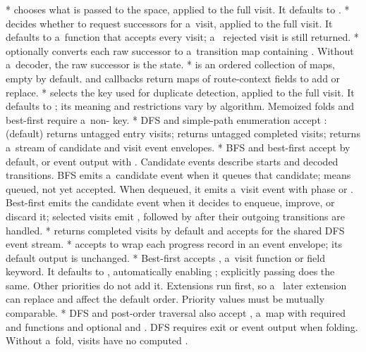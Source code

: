 {\begitems
*  chooses what is passed to the space, applied to the full
  visit. It defaults to .
*  decides whether to request successors for a~visit, applied
  to the full visit. It defaults to a~function that accepts every visit; a~
  rejected visit is still returned.
*  optionally converts each raw successor to a~transition
  map containing . Without a~decoder, the raw successor is the
  state.
*  is an ordered collection of maps, empty by default.
   and  callbacks return maps of route-context fields
  to add or replace.
*  selects the key used for duplicate detection, applied to
  the full visit. It defaults to ; its meaning and restrictions
  vary by algorithm.
  Memoized folds and best-first require a~non- key.
* DFS and simple-path enumeration accept : 
  (default) returns untagged entry visits;  returns untagged
  completed visits;  returns a~stream of candidate and visit
  event envelopes.
* BFS and best-first accept  by default, or event
  output with . Candidate events describe starts and
  decoded transitions. BFS emits a~candidate event when it queues that
  candidate;  means queued, not yet accepted.
  When dequeued, it emits a~visit event with phase  or
  . Best-first emits the candidate event when it decides to
  enqueue, improve, or discard it; selected visits emit ,
  followed by  after their outgoing transitions are handled.
*  returns completed visits by default and accepts
   for the shared DFS event stream.
*  accepts  to wrap each progress record
  in an event envelope; its default output is unchanged.
* Best-first accepts , a~visit function or field keyword.
  It defaults to , automatically enabling
  ; explicitly passing 
  does the same. Other priorities do not add it. Extensions run first, so a~
  later extension can replace  and affect the default order.
  Priority values must be mutually comparable.
* DFS and post-order traversal also accept , a~map with required
   and  functions and optional 
  and .
  DFS requires exit or event output when folding. Without a~fold, visits
  have no computed .
\enditems

}
